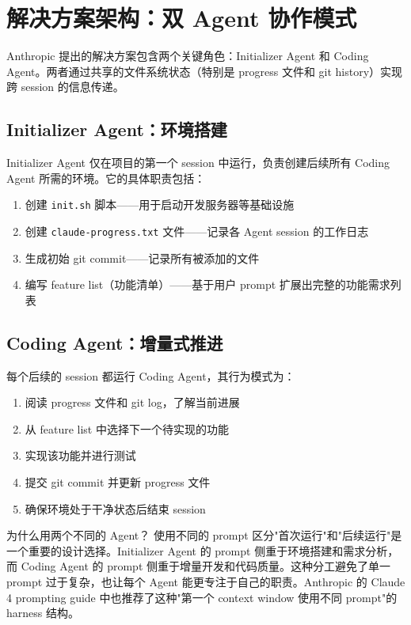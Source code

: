 \section{解决方案架构：双 Agent 协作模式}

Anthropic 提出的解决方案包含两个关键角色：Initializer Agent 和 Coding Agent。两者通过共享的文件系统状态（特别是 progress 文件和 git history）实现跨 session 的信息传递。

\subsection{Initializer Agent：环境搭建}

Initializer Agent 仅在项目的第一个 session 中运行，负责创建后续所有 Coding Agent 所需的环境。它的具体职责包括：

\begin{enumerate}
    \item 创建 \texttt{init.sh} 脚本——用于启动开发服务器等基础设施
    \item 创建 \texttt{claude-progress.txt} 文件——记录各 Agent session 的工作日志
    \item 生成初始 git commit——记录所有被添加的文件
    \item 编写 feature list（功能清单）——基于用户 prompt 扩展出完整的功能需求列表
\end{enumerate}

\subsection{Coding Agent：增量式推进}

每个后续的 session 都运行 Coding Agent，其行为模式为：

\begin{enumerate}
    \item 阅读 progress 文件和 git log，了解当前进展
    \item 从 feature list 中选择下一个待实现的功能
    \item 实现该功能并进行测试
    \item 提交 git commit 并更新 progress 文件
    \item 确保环境处于干净状态后结束 session
\end{enumerate}

\begin{knowledgebox}{为什么用两个不同的 Agent？}
使用不同的 prompt 区分"首次运行"和"后续运行"是一个重要的设计选择。Initializer Agent 的 prompt 侧重于环境搭建和需求分析，而 Coding Agent 的 prompt 侧重于增量开发和代码质量。这种分工避免了单一 prompt 过于复杂，也让每个 Agent 能更专注于自己的职责。Anthropic 的 Claude 4 prompting guide 中也推荐了这种"第一个 context window 使用不同 prompt"的 harness 结构。
\end{knowledgebox}

